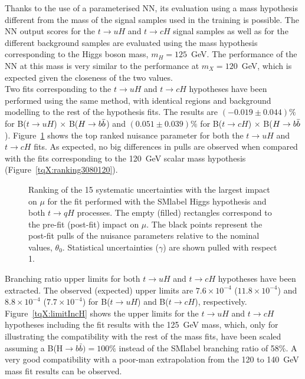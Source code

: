 Thanks to the use of a parameterised NN, its evaluation using a mass hypothesis different from the mass of the signal samples used in the training is possible. The NN output scores for the $t\to uH$ and $t\to cH$ signal samples as well as for the different background samples are evaluated using the mass hypothesis corresponding to the Higgs boson mass, $m_H=125$~GeV. The performance of the NN at this mass is very similar to the performance at $m_X=120$~GeV, which is expected given the closeness of the two values.\\

Two fits corresponding to the $t\to uH$ and $t\to cH$ hypotheses have been performed using the same method, with identical regions and background modelling to the rest of the hypothesis fits. The results are $(-0.019\pm0.044)\%$ for B($t\to uH$) $\times$ B($H\to b\bar{b}$) and $(0.051\pm0.039)\%$ for B($t\to cH$) $\times$ B($H\to b\bar{b}$). Figure~\ref{tqX:RankqH} shows the top ranked nuisance parameter for both the $t\to uH$ and $t\to cH$ fits. As expected, no big differences in pulls are observed when compared with the fits corresponding to the 120~GeV scalar mass hypothesis (Figure~\ref{tqX:ranking3080120}).\\

\begin{figure}[htb]
    \RawFloats
    \centering
    \caption{Ranking of the 15 systematic uncertainties with the largest impact on $\mu$ for the fit performed with the \acrshort{SMlabel} Higgs hypothesis and both $t\to qH$ processes. The empty (filled) rectangles correspond  to the pre-fit (post-fit) impact on $\mu$. The black points represent the post-fit pulls of the nuisance parameters relative to the nominal values, $\theta_0$. Statistical uncertainties ($\gamma$) are shown pulled with respect 1.}
    \label{tqX:RankqH}
\end{figure}

Branching ratio upper limits for both $t\to uH$ and $t\to cH$ hypotheses have been extracted. The observed (expected) upper limits are $7.6\times10^{-4}$ ($11.8\times10^{-4}$) and $8.8\times10^{-4}$ ($7.7\times10^{-4}$) for B($t\to uH$) and B($t\to cH$), respectively. Figure~\ref{tqX:limitIncH} shows the upper limits for the $t\to uH$ and $t\to cH$ hypotheses including the fit results with the 125~GeV mass, which, only for illustrating the compatibility with the rest of the mass fits, have been scaled assuming a B(H$\rightarrow b \bar{b}) = 100\%$ instead of the \acrshort{SMlabel} branching ratio of 58\%. A very good compatibility with a poor-man extrapolation from the 120 to 140~GeV mass fit results can be observed.\\

